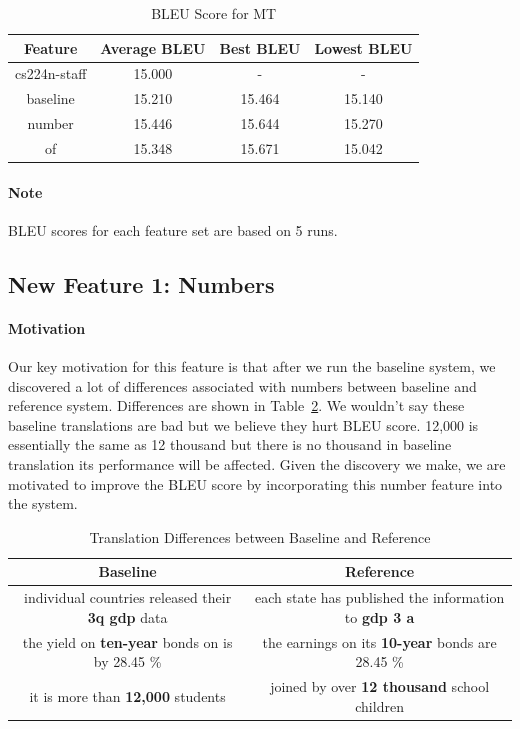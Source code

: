\documentclass{article}
\begin{document}
\begin{table}[!htb]
\centering
\begin{tabular}{c|c|c|c}
\hline
 Feature & Average BLEU & Best BLEU & Lowest BLEU\\
\hline
 cs224n-staff & 15.000 & - & -\\
 baseline & 15.210 & 15.464 & 15.140\\
 number & 15.446 & 15.644 & 15.270 \\
 of & 15.348 & 15.671 & 15.042 \\
\hline
\end{tabular}
\caption{BLEU Score for MT}
\label{tab:bleu}
\end{table}

\paragraph{Note} BLEU scores for each feature set are based on 5 runs.

\subsection{New Feature 1: Numbers}

\paragraph{Motivation} Our key motivation for this feature is that after we run the baseline system, we discovered a lot of differences associated with numbers between baseline and reference system. Differences are shown in Table~\ref{tab:baselinevsreference}. We wouldn't say these baseline translations are bad but we believe they hurt BLEU score. 12,000 is essentially the same as 12 thousand but there is no thousand in baseline translation its performance will be affected. Given the discovery we make, we are motivated to improve the BLEU score by incorporating this number feature into the system.

\begin{table}[!htb]
\centering
\begin{tabular}{c|c}
\hline
 Baseline & Reference \\
\hline
 individual countries released their \textbf{3q gdp} data  & each state has published the information to \textbf{gdp 3 a} \\
 the yield on \textbf{ten-year} bonds on is by 28.45 \% & the earnings on its \textbf{10-year} bonds are 28.45 \% \\
 it is more than \textbf{12,000} students & joined by over \textbf{12 thousand} school children \\
\hline
\end{tabular}
\caption{Translation Differences between Baseline and Reference}
\label{tab:baselinevsreference}
\end{table}
\end{document}
